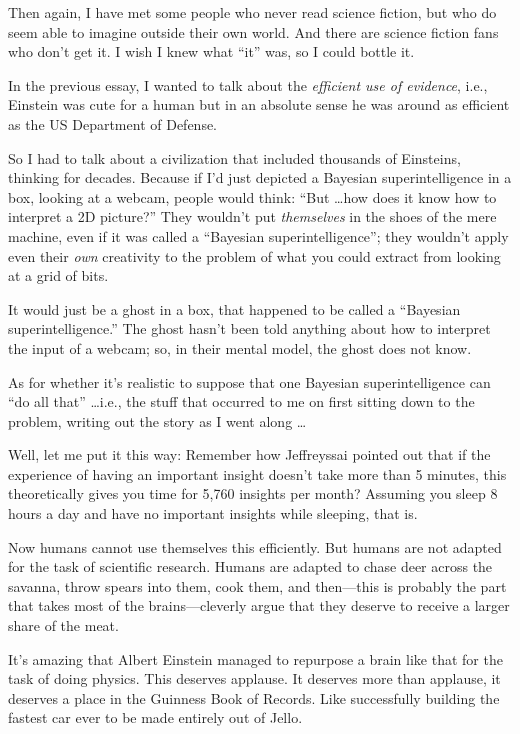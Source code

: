 {
 Then again, I have met some people who never read science fiction,
but who do seem able to imagine outside their own world. And there are
science fiction fans who don't get it. I wish I knew
what ``it'' was, so I could bottle
it.}

{
 In the previous essay, I wanted to talk about the
\textit{efficient use of evidence}, i.e., Einstein was cute for a human
but in an absolute sense he was around as efficient as the US
Department of Defense.}

{
 So I had to talk about a civilization that included thousands of
Einsteins, thinking for decades. Because if I'd just
depicted a Bayesian superintelligence in a box, looking at a webcam,
people would think: ``But \ldots how does it know how
to interpret a 2D picture?'' They
wouldn't put \textit{themselves} in the shoes of the
mere machine, even if it was called a ``Bayesian
superintelligence''; they wouldn't
apply even their \textit{own} creativity to the problem of what you
could extract from looking at a grid of bits.}

{
 It would just be a ghost in a box, that happened to be called a
``Bayesian superintelligence.'' The
ghost hasn't been told anything about how to interpret
the input of a webcam; so, in their mental model, the ghost does not
know.}

{
 As for whether it's realistic to suppose that one
Bayesian superintelligence can ``do all
that'' \ldots i.e., the stuff that occurred to me on
first sitting down to the problem, writing out the story as I went
along \ldots}

{
 Well, let me put it this way: Remember how Jeffreyssai pointed out
that if the experience of having an important insight
doesn't take more than 5 minutes, this theoretically
gives you time for 5,760 insights per month? Assuming you sleep 8 hours
a day and have no important insights while sleeping, that is.}

{
 Now humans cannot use themselves this efficiently. But humans are
not adapted for the task of scientific research. Humans are adapted to
chase deer across the savanna, throw spears into them, cook them, and
then---this is probably the part that takes most of the
brains---cleverly argue that they deserve to receive a larger share of
the meat.}

{
 It's amazing that Albert Einstein managed to
repurpose a brain like that for the task of doing physics. This
deserves applause. It deserves more than applause, it deserves a place
in the Guinness Book of Records. Like successfully building the fastest
car ever to be made entirely out of Jello.}

